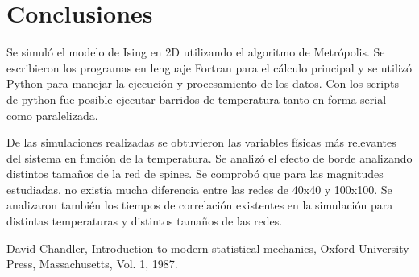 \documentclass[a4paper,12pt]{article}
\begin{document}




\section{Conclusiones}

Se simuló el modelo de Ising en 2D utilizando el algoritmo de Metrópolis. Se 
escribieron los programas en lenguaje Fortran para el cálculo principal y se 
utilizó Python para manejar la ejecución y procesamiento de los datos. Con los 
scripts de python fue posible ejecutar barridos de temperatura tanto en forma 
serial como paralelizada.

De las simulaciones realizadas se obtuvieron las variables físicas más 
relevantes del sistema en función de la temperatura. Se analizó el efecto de 
borde analizando distintos tamaños de la red de spines. Se comprobó que para 
las magnitudes estudiadas, no existía mucha diferencia entre las redes de 40x40 
y 100x100. Se analizaron también los tiempos de correlación existentes en la 
simulación para distintas temperaturas y distintos tamaños de las redes.


\begin{thebibliography}{9}

  David Chandler,
  Introduction to modern statistical mechanics,
  Oxford University Press, Massachusetts,
  Vol. 1,
  1987.

\end{thebibliography}
\end{document}
